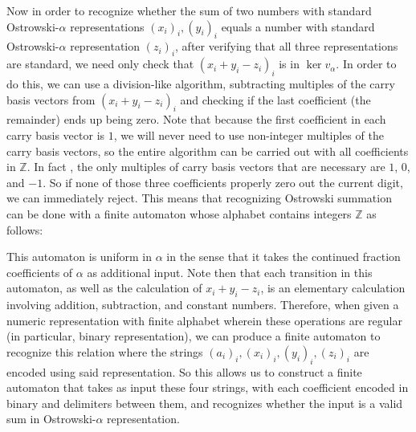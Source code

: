 Now in order to recognize whether the sum of two numbers with standard Ostrowski-$\alpha$ representations $(x_i)_i, (y_i)_i$ equals a number with standard Ostrowski-$\alpha$ representation $(z_i)_i$, after verifying that all three representations are standard, we need only check that $(x_i + y_i - z_i)_i$ is in $\ker v_\alpha$. In order to do this, we can use a division-like algorithm, subtracting multiples of the carry basis vectors from $(x_i + y_i - z_i)_i$ and checking if the last coefficient (the remainder) ends up being zero. Note that because the first coefficient in each carry basis vector is $1$, we will never need to use non-integer multiples of the carry basis vectors, so the entire algorithm can be carried out with all coefficients in $\mathbb{Z}$. In fact , the only multiples of carry basis vectors that are necessary are $1$, $0$, and $-1$. So if none of those three coefficients properly zero out the current digit, we can immediately reject. This means that recognizing Ostrowski summation can be done with a finite automaton whose alphabet contains integers $\mathbb{Z}$ as follows:


This automaton is uniform in $\alpha$ in the sense that it takes the continued fraction coefficients of $\alpha$ as additional input. Note then that each transition in this automaton, as well as the calculation of $x_i + y_i - z_i$, is an elementary calculation involving addition, subtraction, and constant numbers. Therefore, when given a numeric representation with finite alphabet wherein these operations are regular (in particular, binary representation), we can produce a finite automaton to recognize this relation where the strings $(a_i)_i, (x_i)_i, (y_i)_i, (z_i)_i$ are encoded using said representation. So this allows us to construct a finite automaton that takes as input these four strings, with each coefficient encoded in binary and delimiters between them, and recognizes whether the input is a valid sum in Ostrowski-$\alpha$ representation.
	


